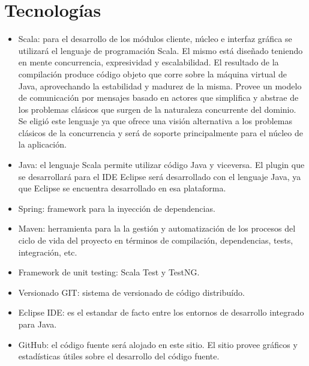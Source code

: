 \documentclass[12pt,a4paper]{article}
\begin{document}
	\section{Tecnologías}
	
	\begin{itemize}
	
	\item Scala: para el desarrollo de los módulos cliente, núcleo e interfaz gráfica se utilizará el lenguaje de programación Scala. El mismo está diseñado teniendo en mente concurrencia, expresividad y escalabilidad. El resultado de la compilación produce código objeto que corre sobre la máquina virtual de Java, aprovechando la estabilidad y madurez de la misma. Provee un modelo de comunicación por mensajes basado en actores que simplifica y abstrae de los problemas clásicos que surgen de la naturaleza concurrente del dominio.
Se eligió este lenguaje ya que ofrece una visión alternativa a los problemas clásicos de la concurrencia y será de soporte principalmente para el núcleo de la aplicación.

	\item Java: el lenguaje Scala permite utilizar código Java y viceversa. El plugin que se desarrollará para el IDE Eclipse será desarrollado con el lenguaje Java, ya que Eclipse se encuentra desarrollado en esa plataforma.

	\item Spring: framework para la inyección de dependencias.

	\item Maven: herramienta para la la gestión y automatización de los procesos del ciclo de vida del proyecto en términos de compilación, dependencias, tests, integración, etc.

	\item Framework de unit testing: Scala Test y TestNG.

	\item Versionado GIT: sistema de versionado de código distribuído.

	\item Eclipse IDE: es el estandar de facto entre los entornos de desarrollo integrado para Java.

	\item GitHub: el código fuente será alojado en este sitio. El sitio provee gráficos y estadísticas útiles sobre el desarrollo del código fuente.	

	\end{itemize}

	
\end{document}
